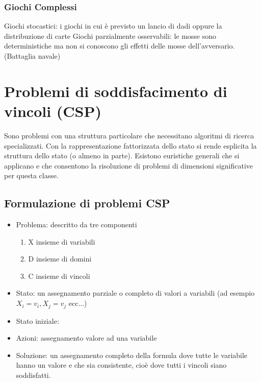 \documentclass{article}
\begin{document}
\subsubsection{Giochi Complessi}
Giochi stocastici: i giochi in cui è previsto un lancio di dadi oppure la distribuzione di carte
Giochi parzialmente osservabili: le mosse sono deterministiche ma non si conoscono gli effetti delle mosse dell’avversario. (Battaglia navale)
\section{Problemi di soddisfacimento di vincoli (CSP)}
Sono problemi con una struttura particolare che necessitano algoritmi di ricerca specializzati. Con la rappresentazione fattorizzata dello stato si rende esplicita la struttura dello stato (o almeno in parte). Esistono euristiche generali che si applicano e che consentono la risoluzione di problemi di dimensioni significative per questa classe.
\subsection{Formulazione di problemi CSP}
\begin{itemize}
    \item Problema: descritto da tre componenti
        \begin{enumerate}
        \item X insieme di variabili
        \item D insieme di domini
        \item C insieme di vincoli
        \end{enumerate}
    \item Stato: un assegnamento parziale o completo di valori a variabili (ad esempio $X_i = v_i, X_j = v_j$ ecc...)
    \item Stato iniziale: {}
    \item Azioni: assegnamento valore ad una variabile
    \item Soluzione: un assegnamento completo della formula dove tutte le variabile hanno un valore e che sia consistente, cioè dove tutti i vincoli siano soddisfatti.
\end{itemize}
\end{document}
